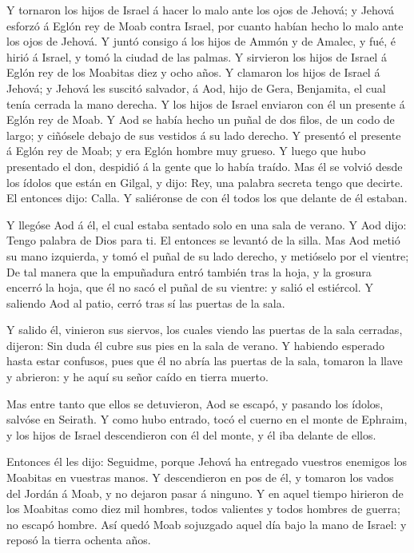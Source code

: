  Y tornaron los hijos de Israel á hacer lo malo ante los
ojos de Jehová; y Jehová esforzó á Eglón rey de Moab contra Israel, por
cuanto habían hecho lo malo ante los ojos de Jehová.  Y
juntó consigo á los hijos de Ammón y de Amalec, y fué, é hirió á Israel,
y tomó la ciudad de las palmas.  Y sirvieron los hijos de
Israel á Eglón rey de los Moabitas diez y ocho años.  Y
clamaron los hijos de Israel á Jehová; y Jehová les suscitó salvador, á
Aod, hijo de Gera, Benjamita, el cual tenía cerrada la mano derecha. Y
los hijos de Israel enviaron con él un presente á Eglón rey de Moab.
 Y Aod se había hecho un puñal de dos filos, de un codo de
largo; y ciñósele debajo de sus vestidos á su lado derecho.
 Y presentó el presente á Eglón rey de Moab; y era Eglón
hombre muy grueso.  Y luego que hubo presentado el don,
despidió á la gente que lo había traído.  Mas él se volvió
desde los ídolos que están en Gilgal, y dijo: Rey, una palabra secreta
tengo que decirte. El entonces dijo: Calla. Y saliéronse de con él todos
los que delante de él estaban.

 Y llegóse Aod á él, el cual estaba sentado solo en una
sala de verano. Y Aod dijo: Tengo palabra de Dios para ti. El entonces
se levantó de la silla.  Mas Aod metió su mano izquierda, y
tomó el puñal de su lado derecho, y metióselo por el vientre;
 De tal manera que la empuñadura entró también tras la
hoja, y la grosura encerró la hoja, que él no sacó el puñal de su
vientre: y salió el estiércol.  Y saliendo Aod al patio,
cerró tras sí las puertas de la sala.

 Y salido él, vinieron sus siervos, los cuales viendo las
puertas de la sala cerradas, dijeron: Sin duda él cubre sus pies en la
sala de verano.  Y habiendo esperado hasta estar confusos,
pues que él no abría las puertas de la sala, tomaron la llave y
abrieron: y he aquí su señor caído en tierra muerto.

 Mas entre tanto que ellos se detuvieron, Aod se escapó, y
pasando los ídolos, salvóse en Seirath.  Y como hubo
entrado, tocó el cuerno en el monte de Ephraim, y los hijos de Israel
descendieron con él del monte, y él iba delante de ellos.

 Entonces él les dijo: Seguidme, porque Jehová ha entregado
vuestros enemigos los Moabitas en vuestras manos. Y descendieron en pos
de él, y tomaron los vados del Jordán á Moab, y no dejaron pasar á
ninguno.  Y en aquel tiempo hirieron de los Moabitas como
diez mil hombres, todos valientes y todos hombres de guerra; no escapó
hombre.  Así quedó Moab sojuzgado aquel día bajo la mano de
Israel: y reposó la tierra ochenta años.

